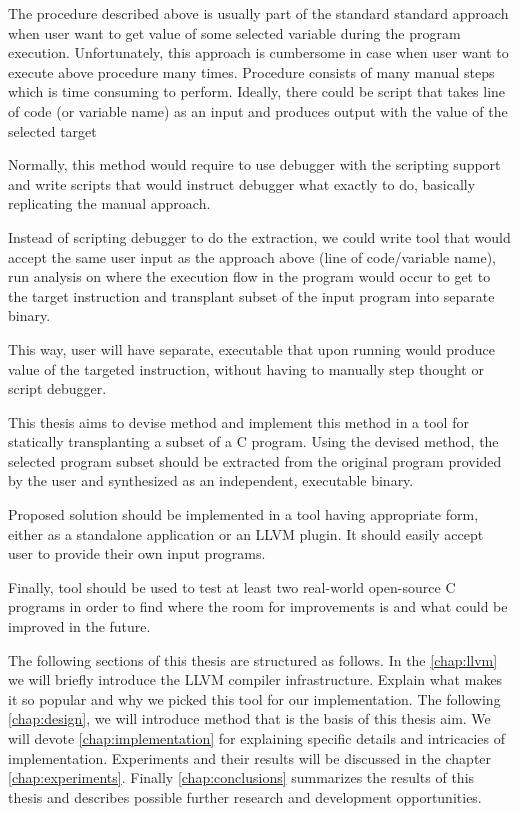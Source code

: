 \documentclass[12pt, twoside]{fithesis2}
\renewcommand{\_}{\leavevmode \kern0.07em\vbox{\hrule width0.4em}}
\begin{document}
The procedure described above is usually part of the standard standard approach
when user want to get value of some selected variable during the program
execution. Unfortunately, this approach is cumbersome in case when user want to
execute above procedure many times. Procedure consists of many manual steps
which is time consuming to perform. Ideally, there could be script that takes
line of code (or variable name) as an input and produces output with the value
of the selected target

Normally, this method would require to use debugger with the scripting support
and write scripts that would instruct debugger what exactly to do, basically
replicating the manual approach.

Instead of scripting debugger to do the extraction, we could write tool that
would accept the same user input as the approach above (line of code/variable
name), run analysis on where the execution flow in the program would occur to
get to the target instruction and transplant subset of the input program into
separate binary.

This way, user will have separate, executable that upon running would produce
value of the targeted instruction, without having to manually step thought or
script debugger.

This thesis aims to devise method and implement this method in a tool for
statically transplanting a subset of a C program. Using the devised method, the
selected program subset should be extracted from the original program provided
by the user and synthesized as an independent, executable binary.

Proposed solution should be implemented in a tool having appropriate form,
either as a standalone application or an LLVM plugin. It should easily accept
user to provide their own input programs.

Finally, tool should be used to test at least two real-world open-source C
programs in order to find where the room for improvements is and what could be
improved in the future.



The following sections of this thesis are structured as follows.
In the \autoref{chap:llvm} we will briefly introduce the LLVM compiler
infrastructure.  Explain what makes it so popular and why we picked this tool
for our implementation.
The following \autoref{chap:design}, we will introduce method that is the basis
of this thesis aim.
We will devote \autoref{chap:implementation} for explaining specific details
and intricacies of implementation.
Experiments and their results will be discussed in the chapter
\autoref{chap:experiments}. Finally \autoref{chap:conclusions} summarizes the
results of this thesis and describes possible further research and development
opportunities.
\end{document}

